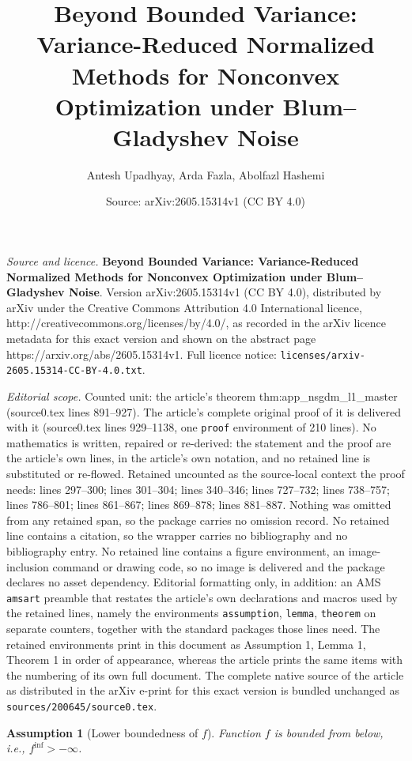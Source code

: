 \documentclass[10pt,a4paper]{amsart}
\title{\vspace{-10mm}\textbf{Beyond Bounded Variance: Variance-Reduced Normalized Methods for Nonconvex Optimization under Blum--Gladyshev Noise}}
\author{Antesh Upadhyay, Arda Fazla, Abolfazl Hashemi}
\date{Source: arXiv:2605.15314v1 (CC BY 4.0)}
\newtheorem{assumption}{Assumption}
\begin{document}
\maketitle

\noindent\emph{Source and licence.} \vspace{-10mm}\textbf{Beyond Bounded Variance: Variance-Reduced Normalized Methods for Nonconvex Optimization under Blum--Gladyshev Noise}. Version arXiv:2605.15314v1 (CC BY 4.0), distributed by arXiv under the Creative Commons Attribution 4.0 International licence, http://creativecommons.org/licenses/by/4.0/, as recorded in the arXiv licence metadata for this exact version and shown on the abstract page https://arxiv.org/abs/2605.15314v1. Full licence notice: \texttt{licenses/arxiv-2605.15314-CC-BY-4.0.txt}.\par\smallskip

\noindent\textit{Editorial scope.} Counted unit: the article's theorem thm:app\_nsgdm\_l1\_master (source0.tex lines 891--927). The article's complete original proof of it is delivered with it (source0.tex lines 929--1138, one \texttt{proof} environment of 210 lines). No mathematics is written, repaired or re-derived: the statement and the proof are the article's own lines, in the article's own notation, and no retained line is substituted or re-flowed.  Retained uncounted as the source-local context the proof needs: lines 297--300; lines 301--304; lines 340--346; lines 727--732; lines 738--757; lines 786--801; lines 861--867; lines 869--878; lines 881--887.  Nothing was omitted from any retained span, so the package carries no omission record.  No retained line contains a citation, so the wrapper carries no bibliography and no bibliography entry.  No retained line contains a figure environment, an image-inclusion command or drawing code, so no image is delivered and the package declares no asset dependency.  Editorial formatting only, in addition: an AMS \texttt{amsart} preamble that restates the article's own declarations and macros used by the retained lines, namely the environments \texttt{assumption}, \texttt{lemma}, \texttt{theorem} on separate counters, together with the standard packages those lines need.  The retained environments print in this document as Assumption 1, Lemma 1, Theorem 1 in order of appearance, whereas the article prints the same items with the numbering of its own full document.  The complete native source of the article as distributed in the arXiv e-print for this exact version is bundled unchanged as \texttt{sources/200645/source0.tex}.
\begin{assumption}[Lower boundedness of $f$]
    \label{as:lower}
    Function $f$ is bounded from below, i.e., $f^{\inf}>-\infty$.
\end{assumption}
\end{document}
